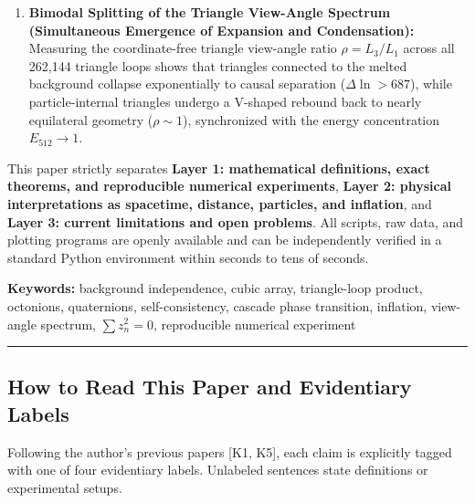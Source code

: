 \documentclass[
  a4paper,
]{article}
\begin{document}
\begin{enumerate}
  \(8 \times 8\) lattice intermediate phase (3,072 cells) and
  recrystallizes into a \textbf{512-cell composite survivor} (stable
  through steps 70--500, with a strict three-level discrete energy
  hierarchy across the 64 elements).
\item
  \textbf{Bimodal Splitting of the Triangle View-Angle Spectrum
  (Simultaneous Emergence of Expansion and Condensation):} Measuring the
  coordinate-free triangle view-angle ratio \(\rho = L_3 / L_1\) across
  all 262,144 triangle loops shows that triangles connected to the
  melted background collapse exponentially to causal separation
  (\(\Delta\ln > 687\)), while particle-internal triangles undergo a
  V-shaped rebound back to nearly equilateral geometry
  (\(\rho \sim 1\)), synchronized with the energy concentration
  \(E_{512} \to 1\).
\end{enumerate}

This paper strictly separates \textbf{Layer 1: mathematical definitions,
exact theorems, and reproducible numerical experiments}, \textbf{Layer
2: physical interpretations as spacetime, distance, particles, and
inflation}, and \textbf{Layer 3: current limitations and open problems}.
All scripts, raw data, and plotting programs are openly available and
can be independently verified in a standard Python environment within
seconds to tens of seconds.

\textbf{Keywords:} background independence, cubic array, triangle-loop
product, octonions, quaternions, self-consistency, cascade phase
transition, inflation, view-angle spectrum, \(\sum z_n^2 = 0\),
reproducible numerical experiment

\begin{center}\rule{0.5\linewidth}{0.5pt}\end{center}

\subsection{How to Read This Paper and Evidentiary
Labels}\label{how-to-read-this-paper-and-evidentiary-labels}

Following the author's previous papers {[}K1, K5{]}, each claim is
explicitly tagged with one of four evidentiary labels. Unlabeled
sentences state definitions or experimental setups.
\end{document}
